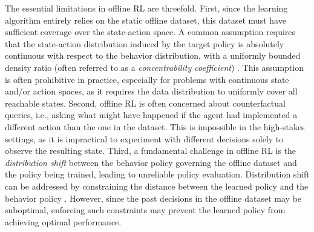 \documentclass[letterpaper, 10 pt, conference]{ieeeconf}  %
\begin{document}
The essential limitations in offline RL are threefold. First, since the learning algorithm entirely relies on the static offline dataset, this dataset must have sufficient coverage over the state-action space. A common assumption requires that the state-action distribution induced by the target policy is absolutely continuous with respect to the behavior distribution, with a uniformly bounded density ratio (often referred to as a \textit{concentrability coefficient}) \cite{munos2005error,munos2008finite,chen2019information,jiang2025offline}. This assumption is often prohibitive in practice, especially for problems with continuous state and/or action spaces, as it requires the data distribution to uniformly cover all reachable states.
Second, offline RL is often concerned about counterfactual queries, i.e., asking what might have happened if the agent had implemented a different action than the one in the dataset. This is impossible in the high-stakes settings, as it is impractical to experiment with different decisions solely to observe the resulting state. Third, a fundamental challenge in offline RL is the \textit{distribution shift} between the behavior policy governing the offline dataset and the policy being trained, leading to unreliable policy evaluation. 
Distribution shift can be addressed by constraining the distance between the learned policy and the behavior policy \cite{kakade2002approximately,schulman2015trust,fujimoto2019off,kumar2019stabilizing,wu2019behavior}. However, since the past decisions in the offline dataset may be suboptimal, enforcing such constraints may prevent the learned policy from achieving optimal performance.
\end{document}
